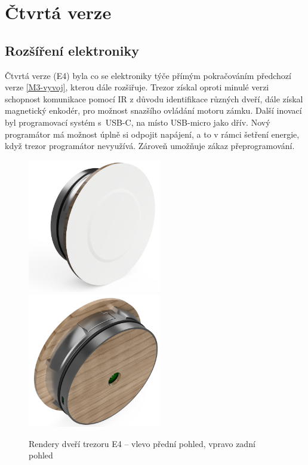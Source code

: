 \vspace{-5mm}

\section{Čtvrtá verze}

\subsection{Rozšíření elektroniky}

Čtvrtá verze (E4) byla co se elektroniky týče přímým pokračováním předchozí verze \ref{M3-vyvoj}, kterou dále rozšiřuje.
Trezor získal oproti minulé verzi schopnost komunikace pomocí IR z dů\-vo\-du identifikace růz\-ných dveří, 
dále získal magnetický enkodér, pro možnost snaz\-ší\-ho ovládání motoru zámku. 
Další inovací byl programovací systém s~USB-C, na místo USB-micro jako dřív. Nový programátor má možnost úplně si odpojit napáje\-ní, a to v rámci šetření 
energie, když trezor programátor nevyužívá. 
Zároveň umožňuje zákaz přeprogramování.

\begin{figure}[htbp]
    \centering
    \includegraphics[width=165pt]{kapitoly/obrazky/E4/predni_render.png}
    \includegraphics[width=165pt]{kapitoly/obrazky/E4/zadni_render.png}
    \caption{Rendery dveří trezoru E4 -- vlevo přední pohled, vpravo zadní pohled \centering}
    \label{fig:E4-render}
\end{figure}

